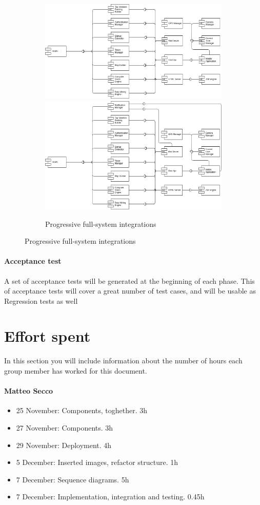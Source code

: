 \documentclass{article}
\begin{document}
\begin{figure}[h]
\begin{subfigure}[H]{\linewidth}
			\includegraphics[width=.49\linewidth]{images/integration_extended_6.png}
			\includegraphics[width=.6\linewidth]{images/integration_extended_8.png}
			\caption{Progressive full-system integrations}
		\end{subfigure}
	\end{figure}

\paragraph{Acceptance test} A set of acceptance tests will be generated at the beginning of each phase. This of acceptance tests will cover a great number of test cases, and will be usable as Regression tests as well

\section{Effort spent}In	 this	 section	you	will	include	information	about	 the	number	of	hours	each	
group	member	has	worked	for	this	document.
	\paragraph{Matteo Secco}
		\begin{itemize}
			\item 25 November: Components, toghether. 3h
			\item 27 November: Components. 3h
			\item 29 November: Deployment. 4h
			\item 5 December: Inserted images, refactor structure. 1h
			\item 7 December: Sequence diagrams. 5h
			\item 7 December: Implementation, integration and testing. 0.45h
		\end{itemize}
\end{document}
